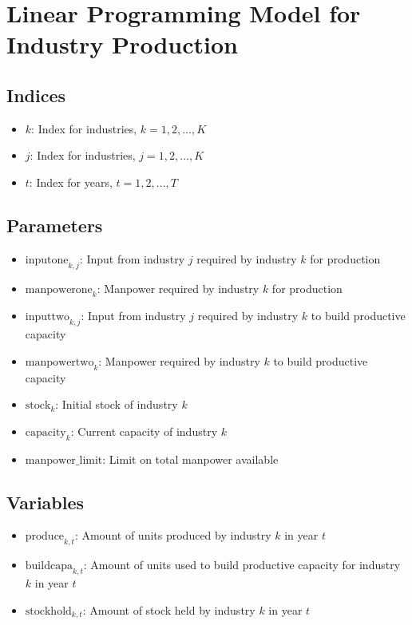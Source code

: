 \documentclass{article}
\begin{document}
\section*{Linear Programming Model for Industry Production}

\subsection*{Indices}
\begin{itemize}
    \item \( k \): Index for industries, \( k = 1, 2, \ldots, K \)
    \item \( j \): Index for industries, \( j = 1, 2, \ldots, K \)
    \item \( t \): Index for years, \( t = 1, 2, \ldots, T \)
\end{itemize}

\subsection*{Parameters}
\begin{itemize}
    \item \( \text{inputone}_{k,j} \): Input from industry \( j \) required by industry \( k \) for production
    \item \( \text{manpowerone}_{k} \): Manpower required by industry \( k \) for production
    \item \( \text{inputtwo}_{k,j} \): Input from industry \( j \) required by industry \( k \) to build productive capacity
    \item \( \text{manpowertwo}_{k} \): Manpower required by industry \( k \) to build productive capacity
    \item \( \text{stock}_{k} \): Initial stock of industry \( k \)
    \item \( \text{capacity}_{k} \): Current capacity of industry \( k \)
    \item \( \text{manpower\_limit} \): Limit on total manpower available
\end{itemize}

\subsection*{Variables}
\begin{itemize}
    \item \( \text{produce}_{k,t} \): Amount of units produced by industry \( k \) in year \( t \)
    \item \( \text{buildcapa}_{k,t} \): Amount of units used to build productive capacity for industry \( k \) in year \( t \)
    \item \( \text{stockhold}_{k,t} \): Amount of stock held by industry \( k \) in year \( t \)
\end{itemize}
\end{document}
